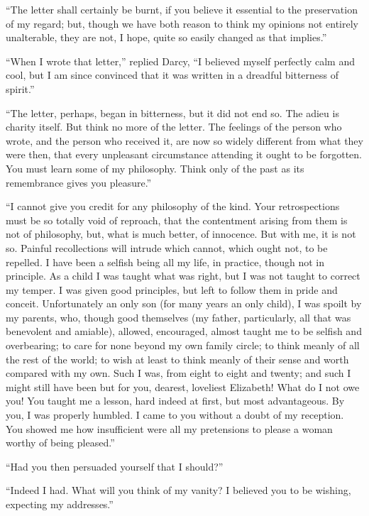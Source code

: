 ``The letter shall certainly be burnt, if you believe it
essential to the preservation of my regard; but, though we have
both reason to think my opinions not entirely unalterable, they
are not, I hope, quite so easily changed as that implies.''

``When I wrote that letter,'' replied Darcy, ``I believed myself
perfectly calm and cool, but I am since convinced that it was
written in a dreadful bitterness of spirit.''

``The letter, perhaps, began in bitterness, but it did not end
so.  The adieu is charity itself.  But think no more of the
letter.  The feelings of the person who wrote, and the person
who received it, are now so widely different from what they
were then, that every unpleasant circumstance attending it
ought to be forgotten.  You must learn some of my philosophy.
Think only of the past as its remembrance gives you pleasure.''

``I cannot give you credit for any philosophy of the kind.
Your retrospections must be so totally void of reproach, that
the contentment arising from them is not of philosophy, but,
what is much better, of innocence.  But with me, it is not
so.  Painful recollections will intrude which cannot, which
ought not, to be repelled.  I have been a selfish being all my
life, in practice, though not in principle.  As a child I was
taught what was right, but I was not taught to correct my
temper.  I was given good principles, but left to follow them
in pride and conceit.  Unfortunately an only son (for many
years an only child), I was spoilt by my parents, who, though
good themselves (my father, particularly, all that was
benevolent and amiable), allowed, encouraged, almost taught me
to be selfish and overbearing; to care for none beyond my own
family circle; to think meanly of all the rest of the world;
to wish at least to think meanly of their sense and worth
compared with my own.  Such I was, from eight to eight and
twenty; and such I might still have been but for you, dearest,
loveliest Elizabeth!  What do I not owe you!  You taught me a
lesson, hard indeed at first, but most advantageous.  By you,
I was properly humbled.  I came to you without a doubt of my
reception.  You showed me how insufficient were all my
pretensions to please a woman worthy of being pleased.''

``Had you then persuaded yourself that I should?''

``Indeed I had.  What will you think of my vanity?  I believed
you to be wishing, expecting my addresses.''

